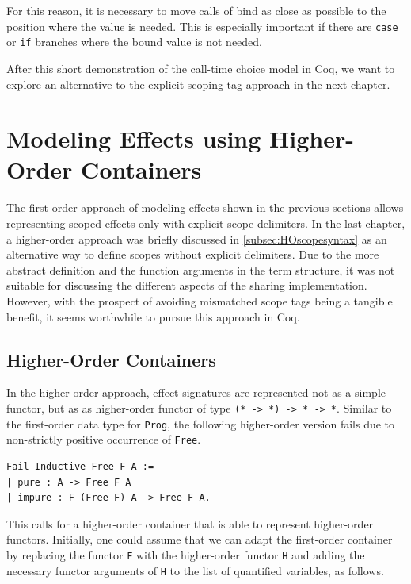 \documentclass[a4paper, 11pt, fleqn, twoside]{scrreprt}
\newcommand{\hinl}[1]{\texttt{#1}}
\newcommand{\cinl}[1]{\texttt{#1}}
\begin{document}
For this reason, it is necessary to move calls of bind as close as possible to the position where the value is needed.
This is especially important if there are \cinl{case} or \cinl{if} branches where the bound value is not needed.

After this short demonstration of the call-time choice model in Coq, we want to explore an alternative to the explicit scoping tag approach in the next chapter.

\section{Modeling Effects using Higher-Order Containers}
\label{sec:coqHO}

The first-order approach of modeling effects shown in the previous sections allows representing scoped effects only with explicit scope delimiters.
In the last chapter, a higher-order approach was briefly discussed in \autoref{subsec:HOscopesyntax} as an alternative way to define scopes without explicit delimiters.
Due to the more abstract definition and the function arguments in the term structure, it was not suitable for discussing the different aspects of the sharing implementation.
However, with the prospect of avoiding mismatched scope tags being a tangible benefit, it seems worthwhile to pursue this approach in Coq.

\subsection{Higher-Order Containers}
\label{subsec-higherOrderContainers}
In the higher-order approach, effect signatures are represented not as a simple functor, but as as higher-order functor of type \hinl{(* -> *) -> * -> *}.
Similar to the first-order data type for \hinl{Prog}, the following higher-order version fails due to non-strictly positive occurrence of \cinl{Free}.

\begin{verbatim}
Fail Inductive Free F A :=
| pure : A -> Free F A
| impure : F (Free F) A -> Free F A.
\end{verbatim}

This calls for a higher-order container that is able to represent higher-order functors.
Initially, one could assume that we can adapt the first-order container by replacing the functor \cinl{F} with the higher-order functor \cinl{H} and adding the necessary functor arguments of \cinl{H} to the list of quantified variables, as follows.
\end{document}
